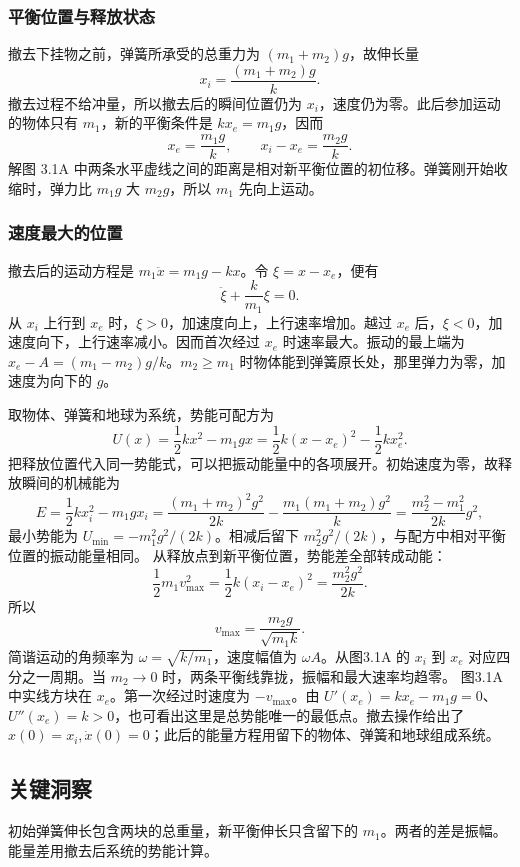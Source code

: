 \documentclass[UTF8,fontset=fandol,a4paper,11pt]{ctexart}
\begin{document}
\subsubsection*{平衡位置与释放状态}
撤去下挂物之前，弹簧所承受的总重力为 $(m_1+m_2)g$，故伸长量
\[
x_i=\frac{(m_1+m_2)g}{k}.
\]
撤去过程不给冲量，所以撤去后的瞬间位置仍为 $x_i$，速度仍为零。此后参加运动的物体只有 $m_1$，新的平衡条件是 $kx_e=m_1g$，因而
\[
x_e=\frac{m_1g}{k},\qquad x_i-x_e=\frac{m_2g}{k}.
\]
解图 3.1A 中两条水平虚线之间的距离是相对新平衡位置的初位移。弹簧刚开始收缩时，弹力比 $m_1g$ 大 $m_2g$，所以 $m_1$ 先向上运动。

\subsubsection*{速度最大的位置}
撤去后的运动方程是 $m_1\ddot x=m_1g-kx$。令 $\xi=x-x_e$，便有
\[
\ddot\xi+\frac{k}{m_1}\xi=0.
\]
从 $x_i$ 上行到 $x_e$ 时，$\xi>0$，加速度向上，上行速率增加。越过 $x_e$ 后，$\xi<0$，加速度向下，上行速率减小。因而首次经过 $x_e$ 时速率最大。振动的最上端为 $x_e-A=(m_1-m_2)g/k$。$m_2\ge m_1$ 时物体能到弹簧原长处，那里弹力为零，加速度为向下的 $g$。

取物体、弹簧和地球为系统，势能可配方为
\[
U(x)=\frac12kx^2-m_1gx
=\frac12k(x-x_e)^2-\frac12kx_e^2.
\]
把释放位置代入同一势能式，可以把振动能量中的各项展开。初始速度为零，故释放瞬间的机械能为
\[
E=\frac12kx_i^2-m_1gx_i
=\frac{(m_1+m_2)^2g^2}{2k}
-\frac{m_1(m_1+m_2)g^2}{k}
=\frac{m_2^2-m_1^2}{2k}g^2,
\]
最小势能为 $U_{\min}=-m_1^2g^2/(2k)$。相减后留下 $m_2^2g^2/(2k)$，与配方中相对平衡位置的振动能量相同。
从释放点到新平衡位置，势能差全部转成动能：
\[
\frac12m_1v_{\max}^2
 =\frac12k(x_i-x_e)^2
 =\frac{m_2^2g^2}{2k}.
\]
所以
\[
\boxed{v_{\max}=\frac{m_2g}{\sqrt{m_1k}}}.
\]
简谐运动的角频率为 $\omega=\sqrt{k/m_1}$，速度幅值为 $\omega A$。从图3.1A 的 $x_i$ 到 $x_e$ 对应四分之一周期。当 $m_2\to0$ 时，两条平衡线靠拢，振幅和最大速率均趋零。
图3.1A 中实线方块在 $x_e$。第一次经过时速度为 $-v_{\max}$。由 $U'(x_e)=kx_e-m_1g=0$、$U''(x_e)=k>0$，也可看出这里是总势能唯一的最低点。撤去操作给出了 $x(0)=x_i,\dot x(0)=0$；此后的能量方程用留下的物体、弹簧和地球组成系统。




\subsection*{关键洞察}

初始弹簧伸长包含两块的总重量，新平衡伸长只含留下的 $m_1$。两者的差是振幅。能量差用撤去后系统的势能计算。
\end{document}
